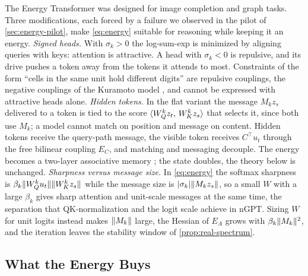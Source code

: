 The Energy Transformer was designed for image completion and graph tasks. Three modifications,
each forced by a failure we observed in the pilot of \cref{sec:energy-pilot}, make
\eqref{eq:energy} suitable for reasoning while keeping it an energy.
\emph{Signed heads.} With $\sigma_k>0$ the log-sum-exp is minimized by aligning queries with keys:
attention is attractive. A head with $\sigma_k<0$ is repulsive, and its drive pushes a token away
from the tokens it attends to most. Constraints of the form ``cells in the same unit hold different
digits'' are repulsive couplings, the negative couplings of the Kuramoto model
\citep{kuramoto1984}, and cannot be expressed with attractive heads alone.
\emph{Hidden tokens.} In the flat variant the message $M_kz_s$ delivered to a token is tied to the
score $\langle W_Q^kz_t,\, W_K^kz_s\rangle$ that selects it, since both use $M_k$; a model cannot match on
position and message on content. Hidden tokens receive the query-path message, the visible token
receives $C^\top u_t$ through the free bilinear coupling $E_C$, and matching and messaging decouple.
The energy becomes a two-layer associative memory \citep{krotov2021hierarchical}; the state doubles,
the theory below is unchanged.
\emph{Sharpness versus message size.} In \eqref{eq:energy} the softmax sharpness is
$\beta_k\lVert W_Q^ku_t\rVert\lVert W_K^kz_s\rVert$ while the message size is $|\sigma_k|\lVert M_kz_s\rVert$, so a
small $W$ with a large $\beta_k$ gives sharp attention and unit-scale messages at the same time, the
separation that QK-normalization and the logit scale achieve in nGPT. Sizing $W$ for unit logits
instead makes $\lVert M_k\rVert$ large, the Hessian of $E_A$ grows with $\beta_k\lVert M_k\rVert^2$, and the
iteration leaves the stability window of \cref{prop:real-spectrum}.

\subsection{What the Energy Buys}
\label{sec:energy-theory}

